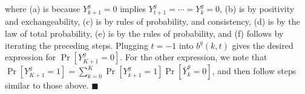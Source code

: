 where (a) is because $Y^g_{k+1}=0$ implies $Y^g_{t+1} = \cdots = Y^g_{k} = 0$, (b) is by positivity and exchangeability, (c) is by rules of probability, and consistency, (d) is by the law of total probability, (e) is by the rules of probability, and (f) follows by iterating the preceding steps. Plugging $t=-1$ into $b^g(k,t)$ gives the desired expression for $\Pr[Y^{g}_{K+1}=0]$. For the other expression, we note that $\Pr[Y^g_{K+1}=1] = \sum_{k=0}^K \Pr[Y^g_{k+1}=1]\Pr[\bar{Y}^g_{k}=0]$, and then follow steps similar to those above. \(\blacksquare\) 